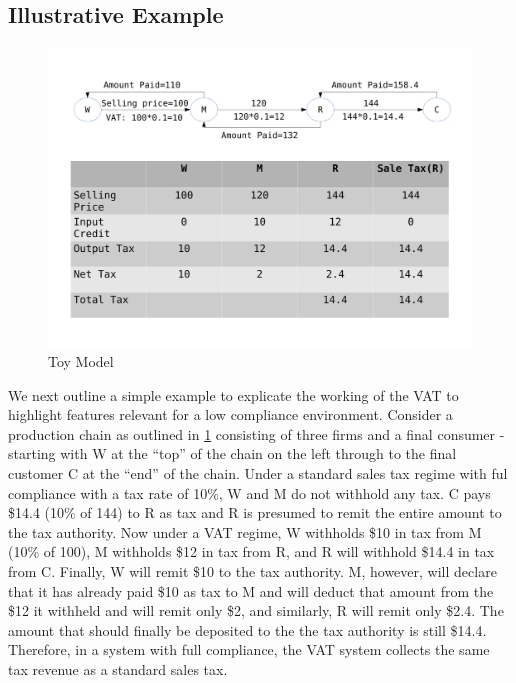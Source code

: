 



\subsection{Illustrative Example}
\label{subsec:background}

\begin{figure}[h] 
 \includegraphics[width=.9\textwidth]{graphs/example_4.pdf}
\caption{Toy Model}
\label{fig:toy-model}
\end{figure}

We next outline a simple example to explicate the working of the VAT to highlight features relevant for a low compliance environment. Consider a production chain as outlined in \cref{fig:toy-model} consisting of three firms and a final consumer - starting with W at the ``top'' of the chain on the left through to the final customer C at the ``end'' of the chain. Under a standard sales tax regime with ful compliance with a tax rate of 10\%, W and M do not withhold any tax. C pays \$14.4 (10\% of 144) to R as tax and R is presumed to remit the entire amount to the tax authority. Now under a
VAT regime, W withholds \$10 in tax from M (10\% of 100), M withholds \$12 in tax from R, and R will withhold \$14.4 in tax from C. Finally, W will remit \$10 to the tax authority. M, however, will declare that it has already paid \$10 as tax to M and will deduct that amount from the \$12 it withheld and will remit only \$2, and similarly, R will remit only \$2.4. The amount that should finally be deposited to the the tax authority is still \$14.4. Therefore, in a system with full compliance, the VAT system collects the same tax revenue as a standard sales tax.

